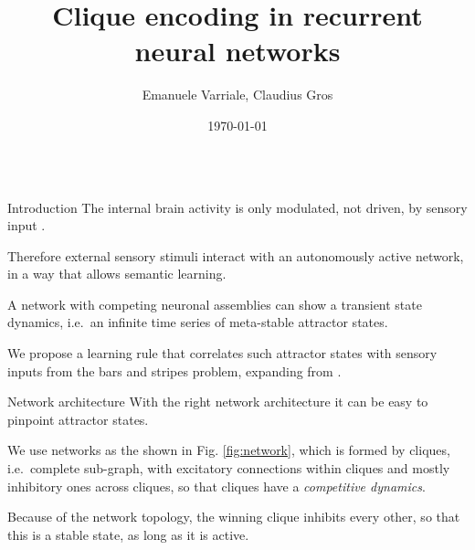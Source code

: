 \documentclass[final,hyperref={pdfpagelabels=false}]{beamer}
\title{Clique encoding in recurrent neural networks} %
\author[varriale@itp.uni-frankfurt.de]{Emanuele Varriale, Claudius Gros}
\institute{Institute for Theoretical Physics, Goethe-University, Frankfurt (Main), Germany}
\date{\today}
\begin{document}
\begin{frame}
	
	\begin{columns}
		
		\hfill
		\begin{column}{.30\textwidth}
				\begin{minipage}[T]{.95\textwidth}	%
					\parbox[t][\columnheight]{\textwidth}{

						\begin{block}{Introduction}
							The internal brain activity is only modulated, not driven, by sensory input \cite{fiser2004modulation}. 
							
							Therefore external sensory stimuli interact with an autonomously active network, in a way that allows semantic learning.
							
							A network with competing neuronal assemblies can show a transient state dynamics, i.e.\ an infinite time series of meta-stable attractor states.
							
							We propose a learning rule that correlates such attractor states with sensory inputs from the bars and stripes problem, expanding from \cite{gros2017semantic}.
						\end{block}
						
						\vfill
						\begin{block}{Network architecture}
							With the right network architecture it can be easy to pinpoint attractor states. 
							
							We use networks as the shown in Fig. \ref{fig:network}, which is formed by cliques, i.e.\ complete sub-graph, with excitatory connections within cliques and mostly inhibitory ones across cliques, so that cliques have a \emph{competitive dynamics}. 
							
							Because of the network topology, the winning clique inhibits every other, so that this is a stable state, as long as it is active.
							

\end{block}}
\end{minipage}
\end{column}
\end{columns}
\end{frame}
\end{document}
